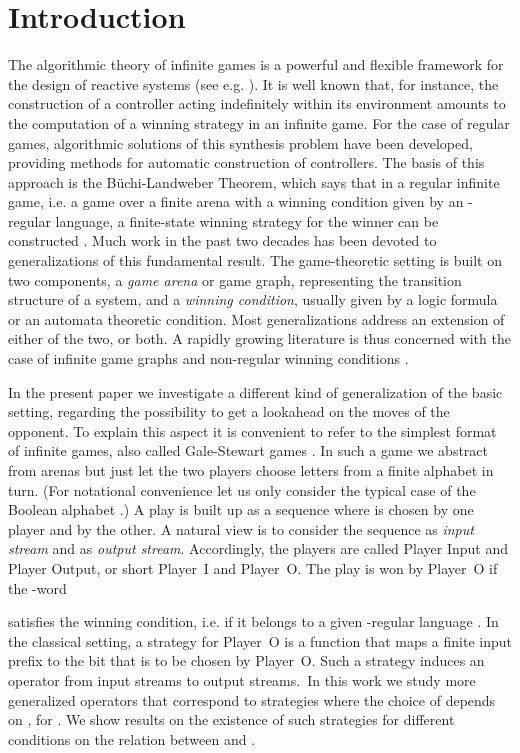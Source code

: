 \documentclass[fleqn,envcountsame]{LMCS}
\newcommand{\pI}{Player~I\xspace}
\newcommand{\pO}{Player~O\xspace}
\newcommand{\ie}{i.e.\xspace}
\begin{document}
\section{Introduction}\label{sec:introduction}
The algorithmic theory of infinite games is a powerful and flexible framework
for the design of reactive systems (see e.g. \cite{GTW02AutLogInfGam}).
It is well known that, for instance, the
construction of a controller acting indefinitely within its
environment amounts to the computation of a winning strategy in an
infinite game. For the case of regular games, algorithmic solutions
of this synthesis problem have been developed, providing methods for
automatic construction of controllers. The basis of this approach is
the B\"uchi-Landweber Theorem, which says that in a regular infinite
game, \ie a game over a finite arena with a winning condition given by
an -regular language, a finite-state winning strategy for the
winner can be constructed \cite{BL69SolSeqCondFinStateStr}.
Much work in the past two decades has been devoted to generalizations of
this fundamental result. The game-theoretic setting is built on
two components, a \emph{game arena} or game graph, representing the
transition structure of a system, and a \emph{winning condition},
usually given by a logic formula or an automata theoretic condition.
Most generalizations address an extension of either of the two, or both.
A rapidly growing literature is thus concerned with the case of infinite game
graphs and non-regular winning conditions \cite{Wal96PushProc,Cach03HighOrdPushAutCaucalHier,BSW03PushGamUnboundRegCond}.

In the present paper we investigate a different kind of generalization of
the basic setting, regarding the possibility to get a lookahead on the moves
of the opponent. To explain this aspect it is convenient to refer to
the simplest format of infinite games, also called Gale-Stewart
games \cite{Mosch80DST}.
In such a game we abstract from arenas but just let the two players choose
letters from a finite alphabet in turn. (For notational convenience let us
only consider the typical case of the Boolean alphabet .)
A play is built up as a sequence  where
 is chosen by one player and  by the other.
A natural view is to consider the sequence
 as \emph{input stream} and  as
\emph{output stream}. Accordingly, the players are called
Player Input and Player Output, or short \pI and \pO.
The play is won by \pO if the -word

satisfies the winning condition, \ie if it belongs to a given -regular
language . In the classical setting, a strategy for \pO is
a function  that maps a finite input prefix  to
the bit  that is to be chosen by \pO. Such a strategy induces an operator
 from input streams to output streams.~In this
work we study more generalized operators that correspond to strategies
where the choice of  depends on , for .
We show results on the existence of such strategies
for different conditions on the relation between  and .
\end{document}
